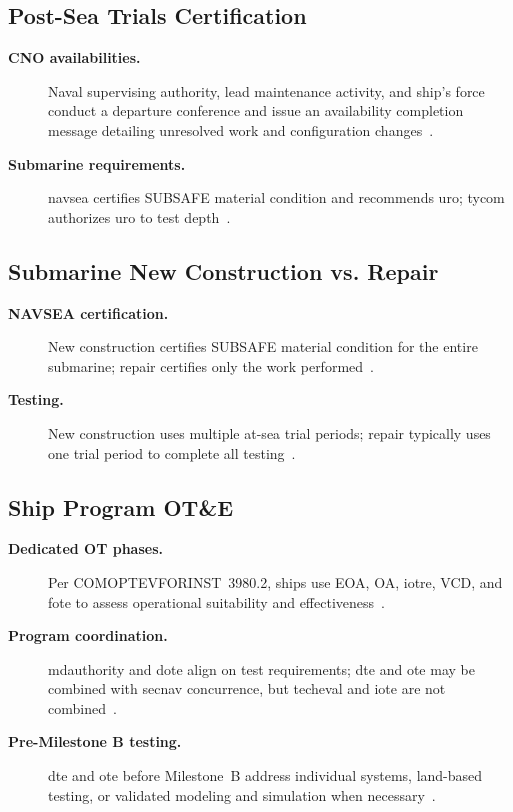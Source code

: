 \documentclass[../main.tex]{subfiles}
\begin{document}
\subsection{Post-Sea Trials Certification}
\begin{description}
  \item[\textbf{CNO availabilities.}] Naval supervising authority, lead maintenance activity, and ship's force conduct a departure conference and issue an availability completion message detailing unresolved work and configuration changes~\autocite{edo-3-5-7-ship-trials-2025}.
  \item[\textbf{Submarine requirements.}] \ac{navsea} certifies SUBSAFE material condition and recommends \ac{uro}; \ac{tycom} authorizes \ac{uro} to test depth~\autocite{edo-3-5-7-ship-trials-2025}.
\end{description}

\subsection{Submarine New Construction vs. Repair}
\begin{description}
  \item[\textbf{NAVSEA certification.}] New construction certifies SUBSAFE material condition for the entire submarine; repair certifies only the work performed~\autocite{edo-3-5-7-ship-trials-2025}.
  \item[\textbf{Testing.}] New construction uses multiple at-sea trial periods; repair typically uses one trial period to complete all testing~\autocite{edo-3-5-7-ship-trials-2025}.
\end{description}

\subsection{Ship Program OT\&E}
\begin{description}
  \item[\textbf{Dedicated OT phases.}] Per COMOPTEVFORINST~3980.2, ships use EOA, OA, \ac{iotre}, VCD, and \ac{fote} to assess operational suitability and effectiveness~\autocite{edo-3-5-7-ship-trials-2025}.
  \item[\textbf{Program coordination.}] \ac{mdauthority} and \ac{dote} align on test requirements; \ac{dte} and \ac{ote} may be combined with \ac{secnav} concurrence, but \ac{techeval} and \ac{iote} are not combined~\autocite{edo-3-5-7-ship-trials-2025}.
  \item[\textbf{Pre-Milestone B testing.}] \ac{dte} and \ac{ote} before Milestone~B address individual systems, land-based testing, or validated modeling and simulation when necessary~\autocite{edo-3-5-7-ship-trials-2025}.
\end{description}
\end{document}
